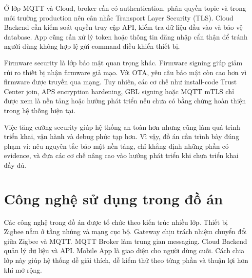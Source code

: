 Ở lớp MQTT và Cloud, broker cần có authentication, phân quyền topic và trong môi trường production nên cân nhắc Transport Layer Security (TLS). Cloud Backend cần kiểm soát quyền truy cập API, kiểm tra dữ liệu đầu vào và bảo vệ database. App cũng cần xử lý token hoặc thông tin đăng nhập cẩn thận để tránh người dùng không hợp lệ gửi command điều khiển thiết bị.

Firmware security là lớp bảo mật quan trọng khác. Firmware signing giúp giảm rủi ro thiết bị nhận firmware giả mạo. Với OTA, yêu cầu bảo mật còn cao hơn vì firmware được truyền qua mạng. Tuy nhiên, các cơ chế như install-code Trust Center join, APS encryption hardening, GBL signing hoặc MQTT mTLS chỉ được xem là nền tảng hoặc hướng phát triển nếu chưa có bằng chứng hoàn thiện trong hệ thống hiện tại.

Việc tăng cường security giúp hệ thống an toàn hơn nhưng cũng làm quá trình triển khai, vận hành và debug phức tạp hơn. Vì vậy, đồ án cần trình bày đúng phạm vi: nêu nguyên tắc bảo mật nền tảng, chỉ khẳng định những phần có evidence, và đưa các cơ chế nâng cao vào hướng phát triển khi chưa triển khai đầy đủ.

\newpage
\section{Công nghệ sử dụng trong đồ án}
\label{sec:ch2-tech-summary}

Các công nghệ trong đồ án được tổ chức theo kiến trúc nhiều lớp. Thiết bị Zigbee nằm ở tầng nhúng và mạng cục bộ. Gateway chịu trách nhiệm chuyển đổi giữa Zigbee và MQTT. MQTT Broker làm trung gian messaging. Cloud Backend quản lý dữ liệu và API. Mobile App là giao diện cho người dùng cuối. Cách chia lớp này giúp hệ thống dễ giải thích, dễ kiểm thử theo từng phần và thuận lợi hơn khi mở rộng.

